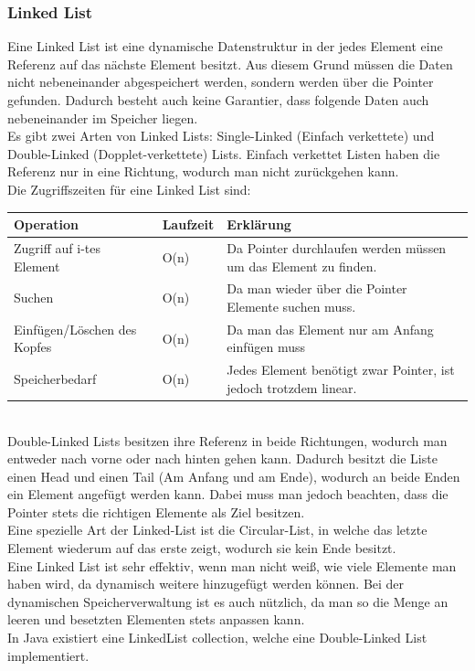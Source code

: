 \documentclass{article}
\begin{document}
	\subsubsection{Linked List}
	Eine Linked List ist eine dynamische Datenstruktur in der jedes Element eine Referenz auf das nächste Element besitzt. Aus diesem Grund müssen die Daten nicht nebeneinander abgespeichert werden, sondern werden über die Pointer gefunden. Dadurch besteht auch keine Garantier, dass folgende Daten auch nebeneinander im Speicher liegen. \\
	Es gibt zwei Arten von Linked Lists: Single-Linked (Einfach verkettete) und Double-Linked (Dopplet-verkettete) Lists. Einfach verkettet Listen haben die Referenz nur in eine Richtung, wodurch man nicht zurückgehen kann. \\
	Die Zugriffszeiten für eine Linked List sind: \\
	\begin{tabular}{| l | l | l |}
		\toprule
		Operation & Laufzeit & Erklärung \\ \midrule
		Zugriff auf i-tes Element & O(n) & Da Pointer durchlaufen werden müssen um das Element zu finden. \\ \hline
		Suchen & O(n) & Da man wieder über die Pointer Elemente suchen muss. \\ \hline
		Einfügen/Löschen des Kopfes & O(n) & Da man das Element nur am Anfang einfügen muss \\ \hline
		Speicherbedarf & O(n) & Jedes Element benötigt zwar Pointer, ist jedoch trotzdem linear.\\
		\bottomrule
	\end{tabular} \\
	Double-Linked Lists besitzen ihre Referenz in beide Richtungen, wodurch man entweder nach vorne oder nach hinten gehen kann. Dadurch besitzt die Liste einen Head und einen Tail (Am Anfang und am Ende), wodurch an beide Enden ein Element angefügt werden kann. Dabei muss man jedoch beachten, dass die Pointer stets die richtigen Elemente als Ziel besitzen. \\
	Eine spezielle Art der Linked-List ist die Circular-List, in welche das letzte Element wiederum auf das erste zeigt, wodurch sie kein Ende besitzt. \\
	Eine Linked List ist sehr effektiv, wenn man nicht weiß, wie viele Elemente man haben wird, da dynamisch weitere hinzugefügt werden können. Bei der dynamischen Speicherverwaltung ist es auch nützlich, da man so die Menge an leeren und besetzten Elementen stets anpassen kann. \\
	In Java existiert eine LinkedList collection, welche eine Double-Linked List implementiert.
\end{document}
